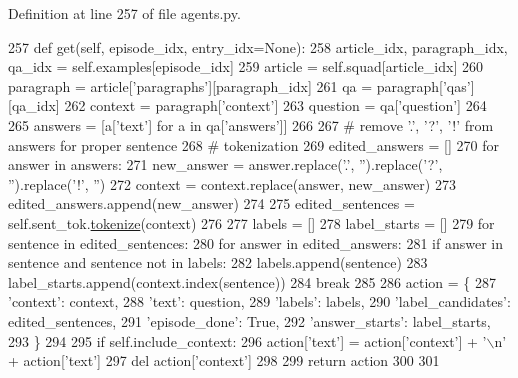 Definition at line 257 of file agents.\+py.


\begin{DoxyCode}
257     \textcolor{keyword}{def }get(self, episode\_idx, entry\_idx=None):
258         article\_idx, paragraph\_idx, qa\_idx = self.examples[episode\_idx]
259         article = self.squad[article\_idx]
260         paragraph = article[\textcolor{stringliteral}{'paragraphs'}][paragraph\_idx]
261         qa = paragraph[\textcolor{stringliteral}{'qas'}][qa\_idx]
262         context = paragraph[\textcolor{stringliteral}{'context'}]
263         question = qa[\textcolor{stringliteral}{'question'}]
264 
265         answers = [a[\textcolor{stringliteral}{'text'}] \textcolor{keywordflow}{for} a \textcolor{keywordflow}{in} qa[\textcolor{stringliteral}{'answers'}]]
266 
267         \textcolor{comment}{# remove '.', '?', '!' from answers for proper sentence}
268         \textcolor{comment}{# tokenization}
269         edited\_answers = []
270         \textcolor{keywordflow}{for} answer \textcolor{keywordflow}{in} answers:
271             new\_answer = answer.replace(\textcolor{stringliteral}{'.'}, \textcolor{stringliteral}{''}).replace(\textcolor{stringliteral}{'?'}, \textcolor{stringliteral}{''}).replace(\textcolor{stringliteral}{'!'}, \textcolor{stringliteral}{''})
272             context = context.replace(answer, new\_answer)
273             edited\_answers.append(new\_answer)
274 
275         edited\_sentences = self.sent\_tok.\hyperlink{namespaceparlai_1_1agents_1_1tfidf__retriever_1_1build__tfidf_a1fdb457e98eb4e4c26047e229686a616}{tokenize}(context)
276 
277         labels = []
278         label\_starts = []
279         \textcolor{keywordflow}{for} sentence \textcolor{keywordflow}{in} edited\_sentences:
280             \textcolor{keywordflow}{for} answer \textcolor{keywordflow}{in} edited\_answers:
281                 \textcolor{keywordflow}{if} answer \textcolor{keywordflow}{in} sentence \textcolor{keywordflow}{and} sentence \textcolor{keywordflow}{not} \textcolor{keywordflow}{in} labels:
282                     labels.append(sentence)
283                     label\_starts.append(context.index(sentence))
284                     \textcolor{keywordflow}{break}
285 
286         action = \{
287             \textcolor{stringliteral}{'context'}: context,
288             \textcolor{stringliteral}{'text'}: question,
289             \textcolor{stringliteral}{'labels'}: labels,
290             \textcolor{stringliteral}{'label\_candidates'}: edited\_sentences,
291             \textcolor{stringliteral}{'episode\_done'}: \textcolor{keyword}{True},
292             \textcolor{stringliteral}{'answer\_starts'}: label\_starts,
293         \}
294 
295         \textcolor{keywordflow}{if} self.include\_context:
296             action[\textcolor{stringliteral}{'text'}] = action[\textcolor{stringliteral}{'context'}] + \textcolor{stringliteral}{'\(\backslash\)n'} + action[\textcolor{stringliteral}{'text'}]
297             del action[\textcolor{stringliteral}{'context'}]
298 
299         \textcolor{keywordflow}{return} action
300 
301 
\end{DoxyCode}


